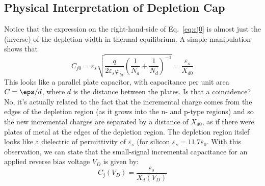 \subsection{Physical Interpretation of Depletion Cap}
Notice that the expression on the right-hand-side of Eq.~\ref{eq:cj0} is almost just the (inverse) of the depletion width in thermal equilibrium.  A simple manipulation shows that
\begin{equation} 
{C_{j0}} = {\varepsilon _s}\sqrt {\frac{q}{{2{\varepsilon _s}{\varphi _{bi}}}}{{\left( {\frac{1}{{{N_a}}} + \frac{1}{{{N_d}}}} \right)}^{ - 1}}}  = \frac{{{\varepsilon _s}}}{{{X_{d0}}}}
\end{equation}
This looks like a parallel plate capacitor, with capacitance per unit area $C = \eps/d$, where $d$ is the distance between the plates. Is that a coincidence?  No, it's actually related to the fact that the incremental charge comes from the edges of the depletion region (as it grows into the n- and p-type regions) and so the new incremental charges are separated by a distance of $X_{d0}$, as if there were plates of metal at the edges of the depletion region.  The depletion region itslef looks like a dielectric of permittivity of $\varepsilon_s$ (for silicon $\varepsilon_s = 11.7 \varepsilon_0$.  With this observation, we can state that the small-signal incremental capacitance for an applied reverse bias voltage $V_D$ is given by:
\begin{equation} 
C_j^{}({V_D}) = \frac{{{\varepsilon _s}}}{{{X_d}({V_D})}} 
\end{equation}
